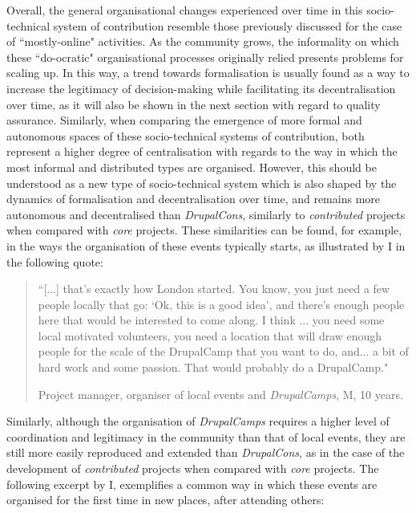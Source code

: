 Overall, the general organisational changes experienced over time in this socio-technical system of contribution resemble those previously discussed for the case of ``mostly-online" activities. As the community grows, the informality on which these ``do-ocratic" organisational processes originally relied presents problems for scaling up. In this way, a trend towards formalisation is usually found as a way to increase the legitimacy of decision-making while facilitating its decentralisation over time, as it will also be shown in the next section with regard to quality assurance. Similarly, when comparing the emergence of more formal and autonomous spaces of these socio-technical systems of contribution, both represent a higher degree of centralisation with regards to the way in which the most informal and distributed types are organised. However, this should be understood as a new type of socio-technical system which is also shaped by the dynamics of formalisation and decentralisation over time, and remains more autonomous and decentralised than \textit{DrupalCons}, similarly to \textit{contributed} projects when compared with \textit{core} projects. These similarities can be found, for example, in the ways the organisation of these events typically starts, as illustrated by I in the following quote:

\begin{quotation}
``[...] that's exactly how London started. You know, you just need a few people locally that go: `Ok, this is a good idea', and there's enough people here that would be interested to come along. I think ... you need some local motivated volunteers, you need a location that will draw enough people for the scale of the DrupalCamp that you want to do, and... a bit of hard work and some passion. That would probably do a DrupalCamp."

\begin{flushright}\footnotesize{Project manager, organiser of local events and \textit{DrupalCamps}, M, 10 years.}\end{flushright}
\end{quotation}

Similarly, although the organisation of \textit{DrupalCamps} requires a higher level of coordination and legitimacy in the community than that of local events, they are still more easily reproduced and extended than \textit{DrupalCons}, as in the case of the development of \textit{contributed} projects when compared with \textit{core} projects. The following excerpt by I, exemplifies a common way in which these events are organised for the first time in new places, after attending others:

